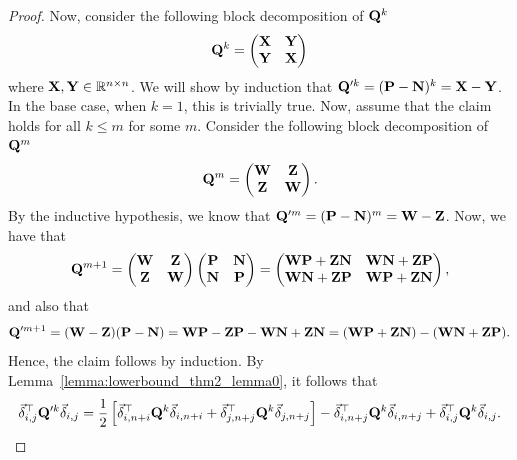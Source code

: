 \begin{proof}
Now, consider the following block decomposition of $\mathbf{Q}^k$
\begin{align*}
    \mathbf{Q}^k = \begin{pmatrix}
        \mathbf{X} & \mathbf{Y} \\ 
        \mathbf{Y} & \mathbf{X}
    \end{pmatrix}
\end{align*}
where $\mathbf{X}, \mathbf{Y} \in \mathbb{R}^{n \times n}$. We will show by induction that $\mathbf{Q}'^k = (\mathbf{P} - \mathbf{N})^k = \mathbf{X} - \mathbf{Y}$. In the base case, when $k = 1$, this is trivially true. Now, assume that the claim holds for all $k \leq m$ for some $m$. Consider the following block decomposition of $\mathbf{Q}^m$
\begin{align*}
    \mathbf{Q}^m = \begin{pmatrix}
        \mathbf{W} & \mathbf{Z} \\ 
        \mathbf{Z} & \mathbf{W}
    \end{pmatrix}.
\end{align*}
By the inductive hypothesis, we know that  $\mathbf{Q}'^m = (\mathbf{P} - \mathbf{N})^m = \mathbf{W} - \mathbf{Z}$. Now, we have that
\begin{align*}
    \mathbf{Q}^{m+1} = \begin{pmatrix}
        \mathbf{W} & \mathbf{Z} \\ 
        \mathbf{Z} & \mathbf{W}
    \end{pmatrix}  \begin{pmatrix}
        \mathbf{P} & \mathbf{N} \\ 
        \mathbf{N} & \mathbf{P}
    \end{pmatrix} = \begin{pmatrix}
        \mathbf{W}\mathbf{P} + \mathbf{Z}\mathbf{N} & \mathbf{W}\mathbf{N} + \mathbf{Z}\mathbf{P} \\ 
        \mathbf{W}\mathbf{N} + \mathbf{Z}\mathbf{P} & \mathbf{W}\mathbf{P} + \mathbf{Z}\mathbf{N}
    \end{pmatrix},
\end{align*}
and also that 
\begin{align*}
    \mathbf{Q}'^{m+1} = (\mathbf{W} - \mathbf{Z})(\mathbf{P} - \mathbf{N}) = \mathbf{W}\mathbf{P} - \mathbf{Z}\mathbf{P} - \mathbf{W}\mathbf{N} + \mathbf{Z}\mathbf{N} = (\mathbf{W}\mathbf{P} + \mathbf{Z}\mathbf{N}) - (\mathbf{W}\mathbf{N} + \mathbf{Z}\mathbf{P}). 
\end{align*}
Hence, the claim follows by induction. By Lemma~\ref{lemma:lowerbound_thm2_lemma0}, it follows that 
\begin{align}\label{eq:lemma:lowerbound_thm2_lemma1_eq1}
    \vec{\delta}_{i,j}^\top \mathbf{Q}'^k \vec{\delta}_{i,j} =  \frac{1}{2} \left[\vec{\delta}_{i,n+i}^\top \mathbf{Q}^k \vec{\delta}_{i,n+i} + \vec{\delta}_{j,n+j}^\top \mathbf{Q}^k \vec{\delta}_{j,n+j}\right] - \vec{\delta}_{i,n+j}^\top \mathbf{Q}^k \vec{\delta}_{i,n+j} + \vec{\delta}_{i,j}^\top \mathbf{Q}^k \vec{\delta}_{i,j}. 
\end{align}


\end{proof}
